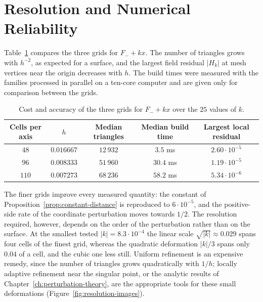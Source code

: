 \documentclass[12pt, a4paper, oneside]{book}
\theoremstyle{plain}
\theoremstyle{definition}
\theoremstyle{remark}
\begin{document}
\section{Resolution and Numerical Reliability}
\label{sec:resolution-study}

Table~\ref{tab:resolution} compares the three grids for $F_-+kx$. The number of
triangles grows with $h^{-2}$, as expected for a surface, and the largest field
residual $|H_k|$ at mesh vertices near the origin decreases with $h$. The build
times were measured with the families processed in parallel on a ten-core
computer and are given only for comparison between the grids.

\begin{table}[!h]
\centering
\small
\begin{tabular}{c c c c c}
\toprule
Cells per axis & $h$ & Median triangles & Median build time & Largest local residual \\
\midrule
$48$  & $0.016667$ & $12\,932$ & $3.5$ ms  & $2.60\cdot10^{-5}$ \\
$96$  & $0.008333$ & $51\,960$ & $30.4$ ms & $1.19\cdot10^{-5}$ \\
$110$ & $0.007273$ & $68\,236$ & $58.2$ ms & $5.34\cdot10^{-6}$ \\
\bottomrule
\end{tabular}
\caption[Resolution comparison]{Cost and accuracy of the three grids for
$F_-+kx$ over the $25$ values of $k$.}
\label{tab:resolution}
\end{table}

The finer grids improve every measured quantity: the constant of
Proposition~\ref{prop:constant-distance} is reproduced to $6\cdot10^{-5}$, and
the positive-side rate of the coordinate perturbation moves towards $1/2$. The
resolution required, however, depends on the order of the perturbation rather
than on the surface. At the smallest tested $|k|=8.3\cdot10^{-4}$ the linear
scale $\sqrt{|k|}\approx0.029$ spans four cells of the finest grid, whereas the
quadratic deformation $|k|/3$ spans only $0.04$ of a cell, and the cubic one
less still. Uniform refinement is an expensive remedy, since the number of
triangles grows quadratically with $1/h$; locally adaptive refinement near the
singular point, or the analytic results of
Chapter~\ref{ch:perturbation-theory}, are the appropriate tools for these
small deformations (Figure~\ref{fig:resolution-images}).
\end{document}
